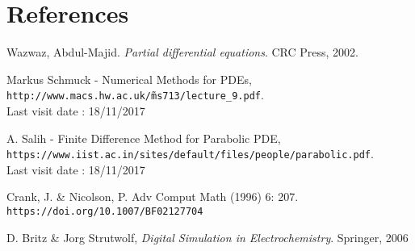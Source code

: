 \documentclass{article}
\begin{document}
        \section{References}
        \begin{thebibliography}{9}
            Wazwaz, Abdul-Majid. \textit{Partial differential equations}. CRC Press, 2002.
    
            Markus Schmuck - Numerical Methods for PDEs,
            \\\texttt{http://www.macs.hw.ac.uk/\~ms713/lecture\_9.pdf}.
            \\Last visit date : 18/11/2017
    
            A. Salih - Finite Difference Method for Parabolic PDE,
            \\\texttt{https://www.iist.ac.in/sites/default/files/people/parabolic.pdf}.
            \\Last visit date : 18/11/2017
    
            
            Crank, J. & Nicolson, P. Adv Comput Math (1996) 6: 207. 
            \\\texttt{https://doi.org/10.1007/BF02127704}
    
            D. Britz \& Jorg Strutwolf, \textit{Digital Simulation in Electrochemistry}.
            Springer, 2006
    
            
            
        \end{thebibliography}
        \newpage
\end{document}

